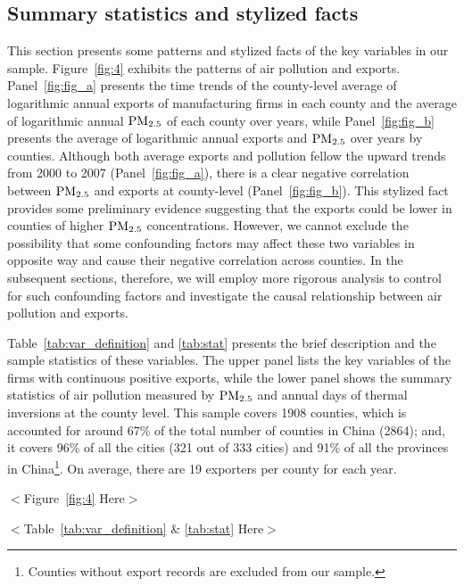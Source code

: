 \documentclass[12pt]{article}
\begin{document}
\subsection{Summary statistics and stylized facts} \label{sec:data_summary}
This section presents some patterns and stylized facts of the key variables in our sample. Figure~\ref{fig:4} exhibits the patterns of air pollution and exports. Panel~\ref{fig:fig_a} presents the time trends of the county-level average of logarithmic annual exports of manufacturing firms in each county and the average of logarithmic annual $\rm PM_{2.5}$ of each county over years, while Panel~\ref{fig:fig_b} presents the average of logarithmic annual exports and $\rm PM_{2.5}$ over years by counties. Although both average exports and pollution fellow the upward trends from 2000 to 2007 (Panel~\ref{fig:fig_a}), there is a clear negative correlation between $\rm PM_{2.5}$ and exports at county-level (Panel~\ref{fig:fig_b}). This stylized fact provides some preliminary evidence suggesting that the exports could be lower in counties of higher $\rm PM_{2.5}$ concentrations. However, we cannot exclude the possibility that some confounding factors may affect these two variables in opposite way and cause their negative correlation across counties. In the subsequent sections, therefore, we will employ more rigorous analysis to control for such confounding factors and investigate the causal relationship between air pollution and exports. 

Table~\ref{tab:var_definition} and \ref{tab:stat} presents the brief description and the sample statistics of these variables. The upper panel lists the key variables of the firms with continuous positive exports, while the lower panel shows the summary statistics of air pollution measured by $\rm PM_{2.5}$ and annual days of thermal inversions at the county level. This sample covers 1908 counties, which is accounted for around 67\% of the total number of counties in China (2864); and, it covers 96\% of all the cities (321 out of 333 cities) and 91\% of all the provinces in China\footnote{Counties without export records are excluded from our sample.}. On average, there are 19 exporters per county for each year. 

\begin{center}
  $<$Figure~\ref{fig:4} Here$>$
  \end{center}

\begin{center}
  $<$Table~\ref{tab:var_definition} \& \ref{tab:stat} Here$>$
  \end{center}
\end{document}
